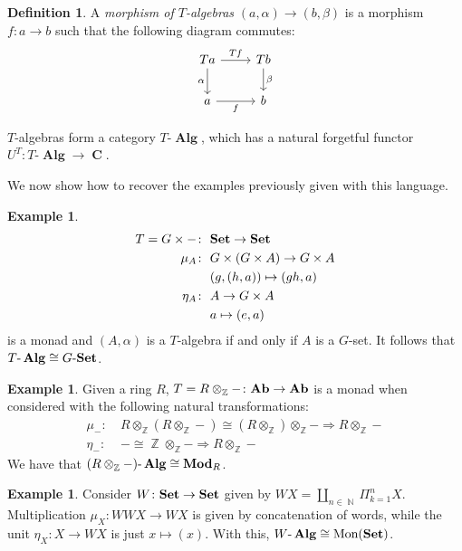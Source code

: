 \documentclass[a4paper,11pt,twoside, openany]{book}
\newcommand{\catname}[1]{{\normalfont\textbf{#1}}}
\DeclareMathOperator{\Alg}{\mathbf{Alg}}
\newcommand{\Set}{\catname{Set}}
\newcommand{\Ab}{\catname{Ab}}
\newcommand{\RMod}{\catname{Mod}_R}
\DeclareMathOperator{\C}{\mathbf{C}}
\DeclareMathOperator{\N}{\mathbb{N}}
\DeclareMathOperator{\Z}{\mathbb{Z}}
\theoremstyle{definition}
\theoremstyle{definition}
\newtheorem{defn}[thm]{Definition} %
\newtheorem{exmp}[thm]{Example} %
\theoremstyle{remark}
\begin{document}
	\begin{defn}
		A \emph{morphism of $T$-algebras} $(a,\alpha)\rightarrow (b,\beta)$ is a morphism $f\colon a\rightarrow b$ such that the following diagram commutes:
		\[
		\begin{tikzcd}
		Ta\arrow["\alpha"']{d}\arrow["Tf"]{r}
		& Tb\arrow["\beta"]{d} \\
		a\arrow["f"']{r}
		& b
		\end{tikzcd}
		\]
	\end{defn}
	
	
	$T$-algebras form a category $T\mbox{-}\Alg$, which has a natural forgetful functor $U^T\colon T\mbox{-}\Alg\rightarrow\C$.
	
	We now show how to recover the examples previously given with this language.
	
	\begin{exmp}
		\begin{align*}
		T=G\times - \colon&\ \Set \rightarrow\Set \\
		\mu_A\colon&\ G\times (G\times A) \rightarrow G\times A \\
		&\ (g,(h,a)) \mapsto (gh,a) \\
		\eta_A\colon&\ A \rightarrow G\times A \\
		&\ a \mapsto (e,a)
		\end{align*}
		is a monad and $(A,\alpha)$ is a $T$-algebra if and only if $A$ is a $G$-set. It follows that $T\mbox{-}\Alg\cong G\mbox{-}\Set$.
	\end{exmp}
	
	\begin{exmp}
		Given a ring $R$, $T=R\otimes_{\Z}-\colon \Ab\rightarrow \Ab$ is a monad when considered with the following natural transformations:
		\begin{align*}
		\mu_{-}\colon &\ R\otimes_{\Z}(R\otimes_{\Z}-)\cong (R\otimes_{\Z})\otimes_{\Z}-\Rightarrow R\otimes_{\Z}- \\
		\eta_-\colon &\ -\cong\Z\otimes_{\Z}-\Rightarrow R\otimes_{\Z}-
		\end{align*}
		We have that $(R\otimes_{\Z}-)\mbox{-}\Alg\cong \RMod$.
	\end{exmp}
	
	\begin{exmp}
		Consider $W\colon\Set\rightarrow\Set$ given by $WX=\amalg_{n\in\N}\Pi_{k=1}^n X$. Multiplication $\mu_X\colon WWX\rightarrow WX$ is given by concatenation of words, while the unit $\eta_X\colon X\rightarrow WX$ is just $x\mapsto (x)$. With this, $W\mbox{-}\Alg\cong \text{Mon}(\Set)$.
	\end{exmp}
	
\end{document}

